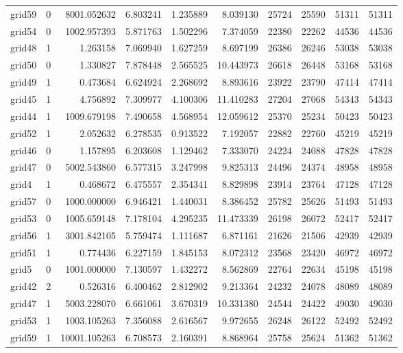 \begin{longtable}{|l|r|r|r|r|r|r|r|r|r|}
grid59 & 0 & 8001.052632 & 6.803241 & 1.235889 & 8.039130 & 25724 & 25590 & 51311 & 51311 \\
grid54 & 0 & 1002.957393 & 5.871763 & 1.502296 & 7.374059 & 22380 & 22262 & 44536 & 44536 \\
grid48 & 1 & 1.263158 & 7.069940 & 1.627259 & 8.697199 & 26386 & 26246 & 53038 & 53038 \\
grid50 & 0 & 1.330827 & 7.878448 & 2.565525 & 10.443973 & 26618 & 26448 & 53168 & 53168 \\
grid49 & 1 & 0.473684 & 6.624924 & 2.268692 & 8.893616 & 23922 & 23790 & 47414 & 47414 \\
grid45 & 1 & 4.756892 & 7.309977 & 4.100306 & 11.410283 & 27204 & 27068 & 54343 & 54343 \\
grid44 & 1 & 1009.679198 & 7.490658 & 4.568954 & 12.059612 & 25370 & 25234 & 50423 & 50423 \\
grid52 & 1 & 2.052632 & 6.278535 & 0.913522 & 7.192057 & 22882 & 22760 & 45219 & 45219 \\
grid46 & 0 & 1.157895 & 6.203608 & 1.129462 & 7.333070 & 24224 & 24088 & 47828 & 47828 \\
grid47 & 0 & 5002.543860 & 6.577315 & 3.247998 & 9.825313 & 24496 & 24374 & 48958 & 48958 \\
grid4 & 1 & 0.468672 & 6.475557 & 2.354341 & 8.829898 & 23914 & 23764 & 47128 & 47128 \\
grid57 & 0 & 1000.000000 & 6.946421 & 1.440031 & 8.386452 & 25782 & 25626 & 51493 & 51493 \\
grid53 & 0 & 1005.659148 & 7.178104 & 4.295235 & 11.473339 & 26198 & 26072 & 52417 & 52417 \\
grid56 & 1 & 3001.842105 & 5.759474 & 1.111687 & 6.871161 & 21626 & 21506 & 42939 & 42939 \\
grid51 & 1 & 0.774436 & 6.227159 & 1.845153 & 8.072312 & 23568 & 23420 & 46972 & 46972 \\
grid5 & 0 & 1001.000000 & 7.130597 & 1.432272 & 8.562869 & 22764 & 22634 & 45198 & 45198 \\
grid42 & 2 & 0.526316 & 6.400462 & 2.812902 & 9.213364 & 24232 & 24078 & 48089 & 48089 \\
grid47 & 1 & 5003.228070 & 6.661061 & 3.670319 & 10.331380 & 24544 & 24422 & 49030 & 49030 \\
grid53 & 1 & 1003.105263 & 7.356088 & 2.616567 & 9.972655 & 26248 & 26122 & 52492 & 52492 \\
grid59 & 1 & 10001.105263 & 6.708573 & 2.160391 & 8.868964 & 25758 & 25624 & 51362 & 51362 \\

\end{longtable}
